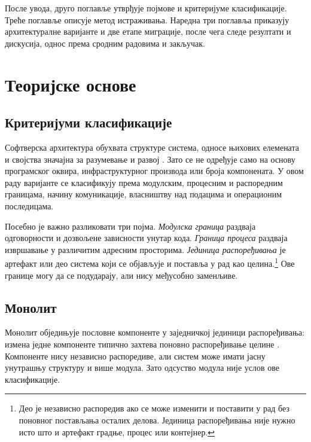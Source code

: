 \documentclass[12pt,oneside]{memoir}
\begin{document}
После увода, друго поглавље утврђује појмове и критеријуме класифи\-кације.
Треће поглавље описује метод истраживања. Наредна три поглавља приказују
архитекту\-ралне варијанте и две етапе миграције, после чега следе резултати и
дискусија, однос према сродним радовима и закључак.
\endgroup

\chapter{Теоријске основе}
\label{chp:teorijske-osnove}
\begingroup
\setlength{\emergencystretch}{3em}

\section{Критеријуми класификације}

Софтверска архитектура обухвата структуре система, односе њихових елемената и
својства значајна за разумевање и развој \cite{bass2012software}. Зато се не
одређује само на основу програмског оквира, инфраструктурног производа или
броја компонената. У овом раду варијанте се класификују према модулским,
процесним и распоредним границама, начину комуникације, власништву над подацима
и операционим последицама.

Посебно је важно разликовати три појма. \emph{Модулска граница} раздваја
одговорности и дозвољене зависности унутар кода. \emph{Граница процеса}
раздваја извршавање у различитим адресним просторима. \emph{Јединица
	распоређивања} је артефакт или део система који се објављује и поставља у рад
као целина.\footnote{Део је независно распоредив ако се може изменити и
	поставити у рад без поновног постављања осталих делова. Јединица
	распоређивања није нужно исто што и артефакт градње, процес или контејнер.}
Ове границе могу да се подударају, али нису међусобно заменљиве.

\section{Монолит}

Монолит обједињује пословне компоненте у заједничкој јединици распоређивања:
измена једне компоненте типично захтева поновно распоређивање целине
\cite{lewis2014microservices,dragoni2017microservices}. Компоненте нису
независно распоредиве, али систем може имати јасну унутрашњу структуру и више
модула. Зато одсуство модула није услов ове класификације.
\end{document}
